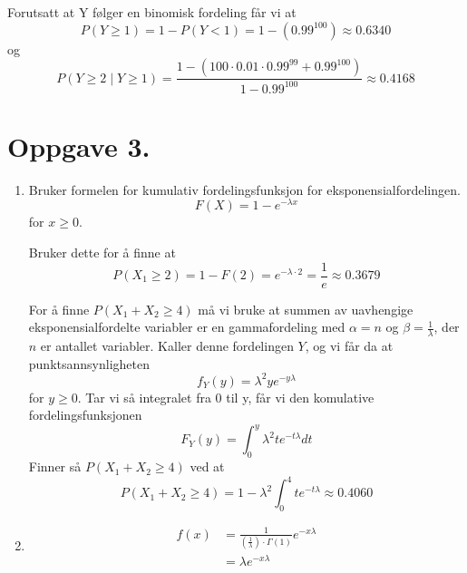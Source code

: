 \documentclass[a4paper,11pt,norsk]{article}
\begin{document}
\begin{enumerate}
{        Forutsatt at Y følger en binomisk fordeling får vi at
        \[
            P(Y \geq 1) = 1 - P(Y < 1) = 1 - (0.99^{100}) \approx 0.6340
        \]
        og 
        \[
            P(Y \geq 2 \mid Y \geq 1) = \frac{1 - (100 \cdot 0.01 \cdot 0.99^{99} + 0.99^{100})}{1 - 0.99^{100}} \approx 0.4168
        \]
    }
\end{enumerate}

\section*{Oppgave 3.}
\begin{enumerate}
    \item {
        Bruker formelen for kumulativ fordelingsfunksjon for eksponensialfordelingen.
        \[
            F(X) = 1 - e^{-\lambda x}
        \]
        for $x \geq 0$.

        Bruker dette for å finne at 
        \[
            P(X_1 \geq 2) = 1 - F(2) = e^{-\lambda \cdot 2} = \frac{1}{e} \approx 0.3679
        \]

        For å finne $P(X_1 + X_2 \geq 4)$ må vi bruke at summen av uavhengige eksponensialfordelte variabler 
        er en gammafordeling med $\alpha = n$ og $\beta = \frac{1}{\lambda}$, der $n$ er antallet variabler.
        Kaller denne fordelingen $Y$, og vi får da at punktsannsynligheten
        \[
            f_{Y}(y) = \lambda^{2}ye^{-y\lambda}
        \]
        for $y \geq 0$. Tar vi så integralet fra 0 til y, får vi den komulative fordelingsfunksjonen
        \[
            F_{Y}(y) = \int_{0}^{y}{\lambda^2te^{-t\lambda}dt}
        \]
        Finner så $P(X_1 + X_2 \geq 4)$ ved at 
        \[
            P(X_1 + X_2 \geq 4) = 1 - \lambda^2\int_{0}^{4}{te^{-t\lambda}} \approx 0.4060
        \]
    }
    \item {
        \begin{align*}
            f(x) &= \frac{1}{\left(\frac{1}{\lambda}\right) \cdot \Gamma(1)}e^{-x\lambda} \\ 
                 &= \lambda e^{-x\lambda} 
        \end{align*}
    }
\end{enumerate}
\end{document}
